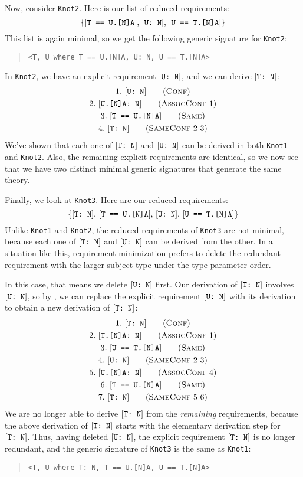 \documentclass[../generics]{subfiles}
\begin{document}
Now, consider \texttt{Knot2}. Here is our list of reduced requirements:
\[\{[\texttt{T == U.[N]A}],\,[\texttt{U:~N}],\,[\texttt{U == T.[N]A}]\}\]
This list is again minimal, so we get the following generic signature for \texttt{Knot2}:
\begin{quote}
\begin{verbatim}
<T, U where T == U.[N]A, U: N, U == T.[N]A>
\end{verbatim}
\end{quote}
In \texttt{Knot2}, we have an explicit requirement $[\texttt{U:~N}]$, and we can derive $[\texttt{T:~N}]$:
\begin{gather*}
\ConfStep{U}{N}{1}\\
\AssocConfStep{1}{U.[N]A}{N}{2}\\
\SameStep{T}{U.[N]A}{3}\\
\SameConfStep{2}{3}{T}{N}{4}
\end{gather*}
We've shown that each one of $[\texttt{T:~N}]$ and $[\texttt{U:~N}]$ can be derived in both \texttt{Knot1} and \texttt{Knot2}. Also, the remaining explicit requirements are identical, so we now see that we have two distinct minimal generic signatures that generate the same theory.

Finally, we look at \texttt{Knot3}. Here are our reduced requirements:
\[\{[\texttt{T:~N}],\,[\texttt{T == U.[N]A}],\,[\texttt{U:~N}],\,[\texttt{U == T.[N]A}]\}\]
Unlike \texttt{Knot1} and \texttt{Knot2}, the reduced requirements of \texttt{Knot3} are not minimal, because each one of $[\texttt{T:~N}]$ and $[\texttt{U:~N}]$ can be derived from the other. In a situation like this, requirement minimization prefers to delete the redundant requirement with the larger subject type under the type parameter order.

In this case, that means we delete $[\texttt{U:~N}]$ first. Our derivation of $[\texttt{T:~N}]$ involves $[\texttt{U:~N}]$, so by , we can replace the explicit requirement $[\texttt{U:~N}]$ with its derivation to obtain a new derivation of $[\texttt{T:~N}]$:
\begin{gather*}
\ConfStep{T}{N}{1}\\
\AssocConfStep{1}{T.[N]A}{N}{2}\\
\SameStep{U}{T.[N]A}{3}\\
\SameConfStep{2}{3}{U}{N}{4}\\
\AssocConfStep{4}{U.[N]A}{N}{5}\\
\SameStep{T}{U.[N]A}{6}\\
\SameConfStep{5}{6}{T}{N}{7}
\end{gather*}
We are no longer able to derive $[\texttt{T:~N}]$ from the \emph{remaining} requirements, because the above derivation of $[\texttt{T:~N}]$ starts with the elementary derivation step for $[\texttt{T:~N}]$. Thus, having deleted $[\texttt{U:~N}]$, the explicit requirement $[\texttt{T:~N}]$ is no longer redundant, and the generic signature of \texttt{Knot3} is the same as \texttt{Knot1}:
\begin{quote}
\begin{verbatim}
<T, U where T: N, T == U.[N]A, U == T.[N]A>
\end{verbatim}
\end{quote}
\end{document}
